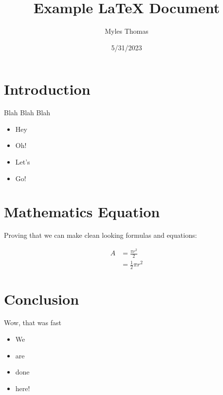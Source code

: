 \documentclass[12pt]{article}
\title{Example LaTeX Document}
\author{Myles Thomas}
\date{5/31/2023}
\begin{document}
\maketitle

\section{Introduction}

Blah Blah Blah

\begin{itemize}

\item Hey

\item Oh!

\item Let's

\item Go!

\end{itemize}


\section{Mathematics Equation}

Proving that we can make clean looking formulas and equations:


\begin{equation} \label{eq1}
\begin{split}
A & = \frac{\pi r^2}{2} \\
& = \frac{1}{2} \pi r^2
\end{split}
\end{equation}

\section{Conclusion}

Wow, that was fast

\begin{itemize}

\item We

\item are

\item done

\item here!

\end{itemize}
\end{document}

